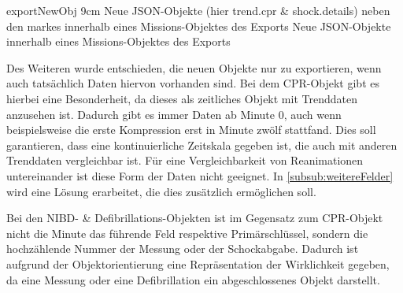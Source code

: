\bild
{exportNewObj}
{9cm}
{Neue JSON-Objekte (hier \glqq trend.cpr\grqq{} \& \glqq shock.details\grqq{}) neben den \glqq markes\grqq{} innerhalb eines Missions-Objektes des Exports}
{Neue JSON-Objekte innerhalb eines Missions-Objektes des Exports}


Des Weiteren wurde entschieden, die neuen Objekte nur zu exportieren, wenn auch tatsächlich Daten hiervon vorhanden sind.
Bei dem \gls{CPR}-Objekt gibt es hierbei eine Besonderheit, da dieses als zeitliches Objekt mit Trenddaten anzusehen ist.
Dadurch gibt es immer Daten ab Minute 0, auch wenn beispielsweise die erste Kompression erst in Minute zwölf stattfand.
Dies soll garantieren, dass eine kontinuierliche Zeitskala gegeben ist, die auch mit anderen Trenddaten vergleichbar ist.
Für eine Vergleichbarkeit von Reanimationen untereinander ist diese Form der Daten nicht geeignet. 
In \ref{subsub:weitereFelder} wird eine Lösung erarbeitet, die dies zusätzlich ermöglichen soll.

Bei den \gls{NIBD}- \& Defibrillations-Objekten ist im Gegensatz zum CPR-Objekt nicht die Minute das führende Feld respektive Primärschlüssel, sondern die hochzählende Nummer der Messung oder der Schockabgabe.
Dadurch ist aufgrund der Objektorientierung eine Repräsentation der Wirklichkeit gegeben, da eine Messung oder eine Defibrillation ein abgeschlossenes Objekt darstellt.





